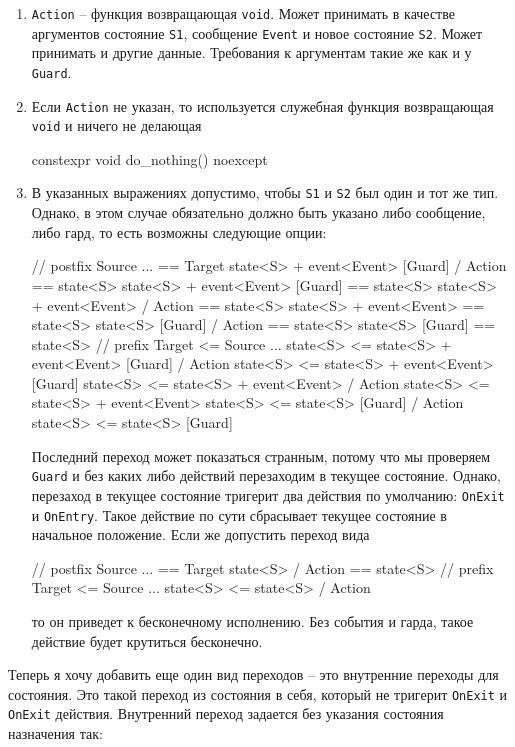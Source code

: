 \documentclass{article}
\begin{document}
{\begin{enumerate}
\item \verb"Action" -- функция возвращающая \verb"void".
Может принимать в качестве аргументов состояние \verb"S1", сообщение \verb"Event" и новое состояние \verb"S2".
Может принимать и другие данные.
Требования к аргументам такие же как и у \verb"Guard".
\item Если \verb"Action" не указан, то используется служебная функция возвращающая \verb"void" и ничего не делающая
\begin{cppcode}[\nonumbers]
constexpr void do_nothing() noexcept {
}
\end{cppcode}

\item В указанных выражениях допустимо, чтобы \verb"S1" и \verb"S2" был один и тот же тип.
Однако, в этом случае обязательно должно быть указано либо сообщение, либо гард, то есть возможны следующие опции:
\begin{cppcode}
// postfix Source ... == Target
state<S> + event<Event> [Guard] / Action == state<S>
state<S> + event<Event> [Guard] == state<S>
state<S> + event<Event> / Action == state<S>
state<S> + event<Event>  == state<S>
state<S> [Guard] / Action == state<S>
state<S> [Guard]  == state<S>
// prefix Target <= Source ...
state<S> <= state<S> + event<Event> [Guard] / Action
state<S> <= state<S> + event<Event> [Guard]
state<S> <= state<S> + event<Event> / Action
state<S> <= state<S> + event<Event>
state<S> <= state<S> [Guard] / Action
state<S> <= state<S> [Guard]
\end{cppcode}
Последний переход может показаться странным, потому что мы проверяем \verb"Guard" и без каких либо действий перезаходим в текущее состояние.
Однако, перезаход в текущее состояние тригерит два действия по умолчанию: \verb"OnExit" и \verb"OnEntry".
Такое действие по сути сбрасывает текущее состояние в начальное положение.
Если же допустить переход вида
\begin{cppcode}[\nonumbers]
// postfix Source ... == Target
state<S> / Action  == state<S>
// prefix Target <= Source ...
state<S> <= state<S> / Action
\end{cppcode}
то он приведет к бесконечному исполнению.
Без события и гарда, такое действие будет крутиться бесконечно.
\end{enumerate}
Теперь я хочу добавить еще один вид переходов -- это внутренние переходы для состояния.
Это такой переход из состояния в себя, который не тригерит \verb"OnExit" и \verb"OnExit" действия.
Внутренний переход задается без указания состояния назначения так:
\begin{cppcode}[\nonumbers]

\end{cppcode}}
\end{document}
